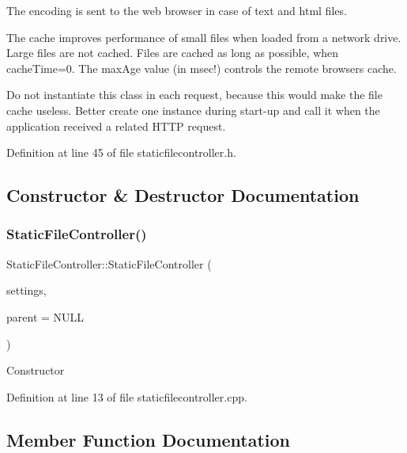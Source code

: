 The encoding is sent to the web browser in case of text and html files. 

The cache improves performance of small files when loaded from a network drive. Large files are not cached. Files are cached as long as possible, when cache\+Time=0. The max\+Age value (in msec!) controls the remote browsers cache. 

Do not instantiate this class in each request, because this would make the file cache useless. Better create one instance during start-\/up and call it when the application received a related H\+T\+TP request. 

Definition at line 45 of file staticfilecontroller.\+h.



\subsection{Constructor \& Destructor Documentation}
\mbox{\label{classstefanfrings_1_1_static_file_controller_a03e1bb06035e3205ad6ddcc7502a245e}} 
\subsubsection{\texorpdfstring{Static\+File\+Controller()}{StaticFileController()}}
{\footnotesize\ttfamily Static\+File\+Controller\+::\+Static\+File\+Controller (\begin{DoxyParamCaption}\item[{Q\+Settings $\ast$}]{settings,  }\item[{Q\+Object $\ast$}]{parent = {\ttfamily NULL} }\end{DoxyParamCaption})}

Constructor 

Definition at line 13 of file staticfilecontroller.\+cpp.



\subsection{Member Function Documentation}
\mbox{\label{classstefanfrings_1_1_static_file_controller_a88bbd874c62c8335d0775629b22871a1}} 
